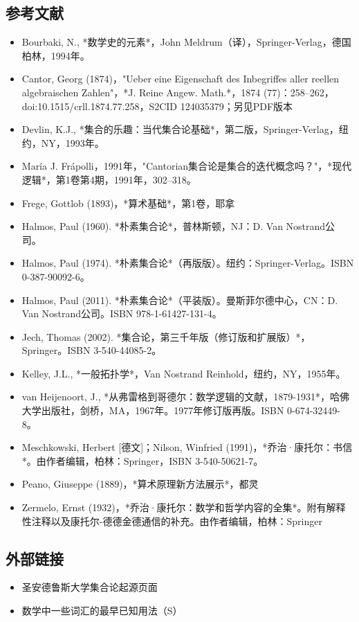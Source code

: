 \subsection{参考文献}   
\begin{itemize}
\item Bourbaki, N., *数学史的元素*，John Meldrum（译），Springer-Verlag，德国柏林，1994年。  
\item Cantor, Georg (1874)，"Ueber eine Eigenschaft des Inbegriffes aller reellen algebraischen Zahlen"，*J. Reine Angew. Math.*，1874 (77)：258–262，doi:10.1515/crll.1874.77.258，S2CID 124035379；另见PDF版本  
\item Devlin, K.J., *集合的乐趣：当代集合论基础*，第二版，Springer-Verlag，纽约，NY，1993年。  
\item María J. Frápolli，1991年，"Cantorian集合论是集合的迭代概念吗？"，*现代逻辑*，第1卷第4期，1991年，302–318。
\item Frege, Gottlob (1893)，*算术基础*，第1卷，耶拿  
\item Halmos, Paul (1960). *朴素集合论*，普林斯顿，NJ：D. Van Nostrand公司。  
\item Halmos, Paul (1974). *朴素集合论*（再版版）。纽约：Springer-Verlag。ISBN 0-387-90092-6。  
\item Halmos, Paul (2011). *朴素集合论*（平装版）。曼斯菲尔德中心，CN：D. Van Nostrand公司。ISBN 978-1-61427-131-4。
\item Jech, Thomas (2002). *集合论，第三千年版（修订版和扩展版）*，Springer。ISBN 3-540-44085-2。  
\item Kelley, J.L., *一般拓扑学*，Van Nostrand Reinhold，纽约，NY，1955年。  
\item van Heijenoort, J., *从弗雷格到哥德尔：数学逻辑的文献，1879-1931*，哈佛大学出版社，剑桥，MA，1967年。1977年修订版再版。ISBN 0-674-32449-8。  
\item Meschkowski, Herbert [德文]；Nilson, Winfried (1991)，*乔治·康托尔：书信*。由作者编辑，柏林：Springer，ISBN 3-540-50621-7。
\item Peano, Giuseppe (1889)，*算术原理新方法展示*，都灵  
\item Zermelo, Ernst (1932)，*乔治·康托尔：数学和哲学内容的全集*。附有解释性注释以及康托尔-德德金德通信的补充。由作者编辑，柏林：Springer
\end{itemize}
\subsection{外部链接}  
\begin{itemize}
\item 圣安德鲁斯大学集合论起源页面  
\item 数学中一些词汇的最早已知用法（S）
\end{itemize}